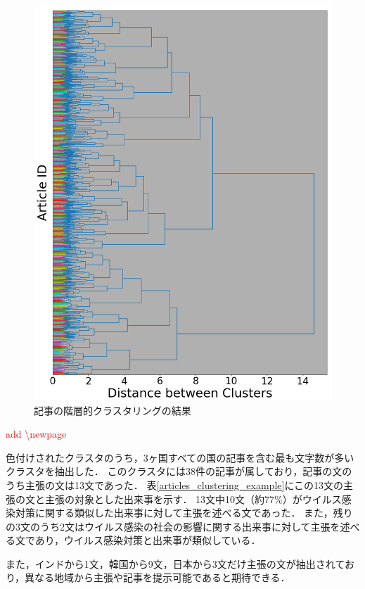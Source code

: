 \documentclass[12pt,a4j]{jreport}
\begin{document}
\begin{figure}[H]
	\centering
	\includegraphics[keepaspectratio, width=120mm]{img/process-06_articles-cluster_color_dendrogram_with-threshold-85_reduced-data-to-5000_Trim.png}
	\caption{記事の階層的クラスタリングの結果}
	\label{articles_dendrogram}
\end{figure}

\textcolor{red}{add \textbackslash newpage}
\newpage

色付けされたクラスタのうち，3ヶ国すべての国の記事を含む最も文字数が多いクラスタを抽出した．
このクラスタには38件の記事が属しており，記事の文のうち主張の文は13文であった．
表\ref{articles_clustering_example}にこの13文の主張の文と主張の対象とした出来事を示す．
13文中10文（約77\%）がウイルス感染対策に関する類似した出来事に対して主張を述べる文であった．
また，残りの3文のうち2文はウイルス感染の社会の影響に関する出来事に対して主張を述べる文であり，ウイルス感染対策と出来事が類似している．

また，インドから1文，韓国から9文，日本から3文だけ主張の文が抽出されており，異なる地域から主張や記事を提示可能であると期待できる．
\end{document}
